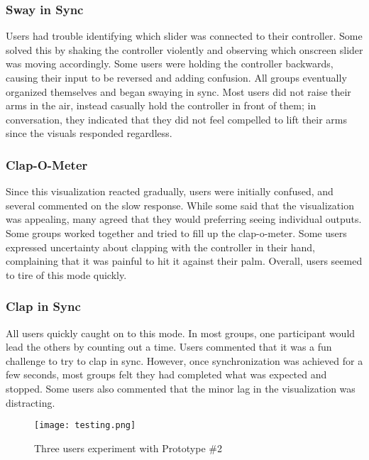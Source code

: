 \subsubsection{Sway in Sync}
Users had trouble identifying which slider was connected to their controller. Some solved this by shaking the controller violently and observing which onscreen slider was moving accordingly. Some users were holding the controller backwards, causing their input to be reversed and adding confusion. All groups eventually organized themselves and began swaying in sync. Most users did not raise their arms in the air, instead casually hold the controller in front of them; in conversation, they indicated that they did not feel compelled to lift their arms since the visuals responded regardless.

\subsubsection{Clap-O-Meter}
Since this visualization reacted gradually, users were initially confused, and several commented on the slow response. While some said that the visualization was appealing, many agreed that they would preferring seeing individual outputs. Some groups worked together and tried to fill up the clap-o-meter. Some users expressed uncertainty about clapping with the controller in their hand, complaining that it was painful to hit it against their palm. Overall, users seemed to tire of this mode quickly.

\subsubsection{Clap in Sync}
All users quickly caught on to this mode. In most groups, one participant would lead the others by counting out a time. Users commented that it was a fun challenge to try to clap in sync. However, once synchronization was achieved for a few seconds, most groups felt they had completed what was expected and stopped. Some users also commented that the minor lag in the visualization was distracting.

\begin{figure}
	\centering

	\texttt{[image: testing.png]}
	\caption{Three users experiment with Prototype \#2}

	\label{prototyping2.5}
\end{figure}

